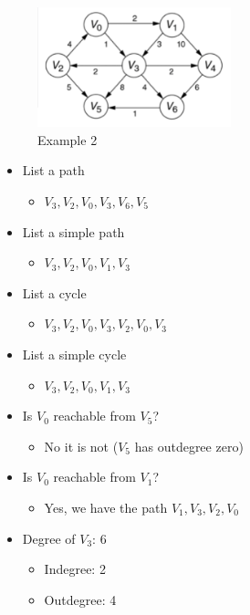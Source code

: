 \documentclass[
  10pt,
  english,
  letterpaper,
,tablecaptionabove
]{scrartcl}
\providecommand{\tightlist}{%
  \setlength{\itemsep}{0pt}\setlength{\parskip}{0pt}}
\begin{document}
\begin{figure}
\centering
\includegraphics[width=0.5\textwidth,height=\textheight]{images/2.png}
\caption{Example 2}
\end{figure}

\begin{itemize}
\tightlist
\item
  List a path

  \begin{itemize}
  \tightlist
  \item
    \(V_3, V_2, V_0, V_3, V_6, V_5\)
  \end{itemize}
\item
  List a simple path

  \begin{itemize}
  \tightlist
  \item
    \(V_3, V_2, V_0, V_1, V_3\)
  \end{itemize}
\item
  List a cycle

  \begin{itemize}
  \tightlist
  \item
    \(V_3, V_2, V_0, V_3, V_2, V_0, V_3\)
  \end{itemize}
\item
  List a simple cycle

  \begin{itemize}
  \tightlist
  \item
    \(V_3, V_2, V_0, V_1, V_3\)
  \end{itemize}
\item
  Is \(V_0\) reachable from \(V_5\)?

  \begin{itemize}
  \tightlist
  \item
    No it is not (\(V_5\) has outdegree zero)
  \end{itemize}
\item
  Is \(V_0\) reachable from \(V_1\)?

  \begin{itemize}
  \tightlist
  \item
    Yes, we have the path \(V_1, V_3, V_2, V_0\)
  \end{itemize}
\item
  Degree of \(V_3\): 6

  \begin{itemize}
  \tightlist
  \item
    Indegree: 2
  \item
    Outdegree: 4
  \end{itemize}
\end{itemize}
\end{document}
